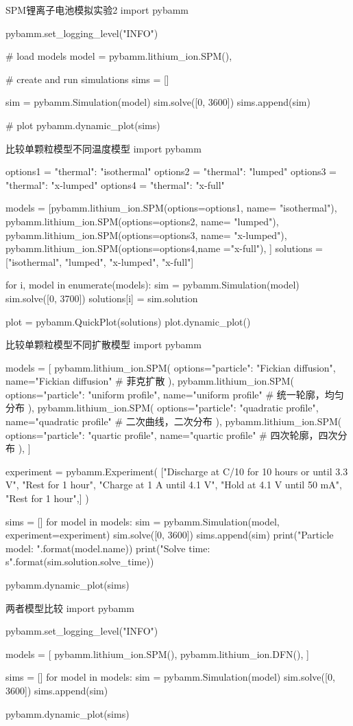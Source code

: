 \documentclass[12pt]{ctexart}%
\begin{document}
\begin{Python}{SPM锂离子电池模拟实验2}
	import pybamm
	
	pybamm.set_logging_level("INFO")
	
	# load models
	model = pybamm.lithium_ion.SPM(),
	
	# create and run simulations
	sims = []
	
	sim = pybamm.Simulation(model)
	sim.solve([0, 3600])
	sims.append(sim)
	
	# plot
	pybamm.dynamic_plot(sims)
\end{Python}
\begin{Python}{比较单颗粒模型不同温度模型}
	import pybamm
	
	options1 = {"thermal": "isothermal"}
	options2 = {"thermal": "lumped"}
	options3 = {"thermal": "x-lumped"}
	options4 = {"thermal": "x-full"}
	
	models = [pybamm.lithium_ion.SPM(options=options1, name= "isothermal"),
	pybamm.lithium_ion.SPM(options=options2, name= "lumped"),
	pybamm.lithium_ion.SPM(options=options3, name= "x-lumped"),
	pybamm.lithium_ion.SPM(options=options4,name ="x-full"),
	]
	solutions = ["isothermal", "lumped", "x-lumped", "x-full"]
	
	for i, model in enumerate(models):
	sim = pybamm.Simulation(model)
	sim.solve([0, 3700])
	solutions[i] = sim.solution
	
	
	plot = pybamm.QuickPlot(solutions)
	plot.dynamic_plot()
\end{Python}
\begin{Python}{比较单颗粒模型不同扩散模型}
import pybamm

models = [
	pybamm.lithium_ion.SPM(
	options={"particle": "Fickian diffusion"}, name="Fickian diffusion"   # 菲克扩散
	),
	pybamm.lithium_ion.SPM(
	options={"particle": "uniform profile"}, name="uniform profile"       # 统一轮廓，均匀分布
	),
	pybamm.lithium_ion.SPM(
	options={"particle": "quadratic profile"}, name="quadratic profile"    # 二次曲线，二次分布
	),
	pybamm.lithium_ion.SPM(
	options={"particle": "quartic profile"}, name="quartic profile"       # 四次轮廓，四次分布
	),
]

experiment = pybamm.Experiment(
	["Discharge at C/10 for 10 hours or until 3.3 V",
	"Rest for 1 hour",
	"Charge at 1 A until 4.1 V",
	"Hold at 4.1 V until 50 mA",
	"Rest for 1 hour",]
)

sims = []
for model in models:
	sim = pybamm.Simulation(model, experiment=experiment)
	sim.solve([0, 3600])
	sims.append(sim)
	print("Particle model: {}".format(model.name))
	print("Solve time: {}s".format(sim.solution.solve_time))

pybamm.dynamic_plot(sims)
\end{Python}
\begin{Python}{两者模型比较}
import pybamm

pybamm.set_logging_level("INFO")


models = [
	pybamm.lithium_ion.SPM(),
	pybamm.lithium_ion.DFN(),
]


sims = []
for model in models:
	sim = pybamm.Simulation(model)
	sim.solve([0, 3600])
	sims.append(sim)

pybamm.dynamic_plot(sims)
\end{Python}
\end{document}
